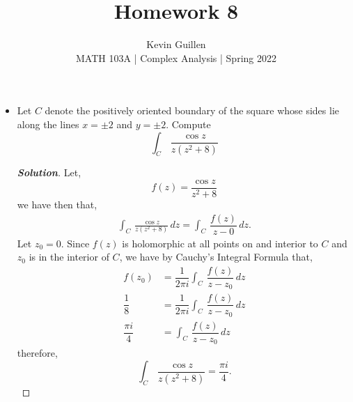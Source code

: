 \documentclass[11pt]{article}
\newenvironment{problem}[2][Problem\!]{\begin{trivlist}
\item[\hskip \labelsep {\bfseries #1}\hskip \labelsep {\bfseries #2}]}{\end{trivlist}}
\newenvironment{solution}{\begin{proof}[\textbf{\textit{Solution}}] }{\end{proof}}
\begin{document}
 
\title{Homework 8}
\author{Kevin Guillen\\[0.5em]
MATH 103A | Complex Analysis | Spring 2022}
\date{} 
\maketitle


\begin{problem}{8.1}\hfill
\begin{itemize}[itemsep=3em]
\item[(a)] Let $C$ denote the positively oriented boundary of the square whose sides lie along the lines $x = \pm 2$ and $y = \pm 2$. Compute
\[\int_C\,\frac{\cos z}{z(z^2 + 8)}\]
\begin{solution}
    Let,
    \[f(z) = \dfrac{\cos z}{z^{2}+8}\] 
    we have then that,
    \begin{align*}
        \int_C\,\frac{\cos z}{z(z^2 + 8)}\, d z = \int_C\, \dfrac{f(z)}{z - 0}\, d z .
    \end{align*}
    Let $z_0 = 0$. Since $f(z)$ is holomorphic at all points on and interior to $C$ and $z_0$ is in the interior of $C$, we have by Cauchy's Integral Formula that,
    \begin{align*}
        f(z_0) &= \dfrac{1}{2\pi i} \int_C \, \dfrac{f(z)}{z - z_0} \, d z \\
        \dfrac{1}{8} &= \dfrac{1}{2\pi i}\int_C \, \dfrac{f(z)}{z - z_0} \, d z  \\
        \dfrac{\pi i }{4} & = \int_C \, \dfrac{f(z)}{z - z_0} \, d z 
    \end{align*}
    therefore,
    \[\int_C\,\frac{\cos z}{z(z^2 + 8)} = \dfrac{\pi i}{4}.\]
\end{solution}


\end{itemize}
\end{problem}
\end{document}
